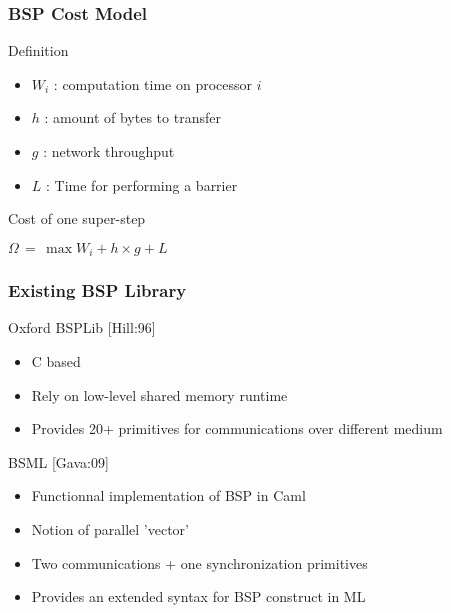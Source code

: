 \frame
{
  \frametitle{BSP Cost Model}
  \begin{block}{Definition}
  \begin{itemize}
  \footnotesize
  \item $W_i$ : computation time on processor $i$
  \item $h$ : amount of bytes to transfer
  \item $g$ : network throughput
  \item $L$ : Time for performing a barrier
 \end{itemize}
  \end{block}{}

  \begin{block}{Cost of one super-step}
  \begin{center}
  $\Omega \, = \, \max W_i + h \times g + L$
  \end{center}
  \end{block}{}
}

\frame
{
  \frametitle{Existing BSP Library}
  \begin{block}{Oxford BSPLib [Hill:96]}
  \begin{itemize}
  \footnotesize
  \item C based
  \item Rely on low-level shared memory runtime
  \item Provides 20+ primitives for communications over different medium
 \end{itemize}
  \end{block}{}

  \begin{block}{BSML [Gava:09]}
  \begin{itemize}
  \footnotesize
  \footnotesize
  \item Functionnal implementation of BSP in Caml
  \item Notion of parallel 'vector'
  \item Two communications + one synchronization primitives 
  \item Provides an extended syntax for BSP construct in ML
  \end{itemize}
  \end{block}{}
}

